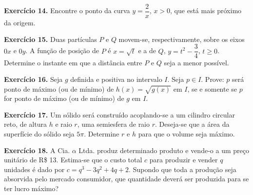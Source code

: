 \documentclass[12pt,a4paper]{article}
\begin{document}
\vspace{0.5cm}
\noindent\textbf{Exercício 14.} Encontre o ponto da curva $y = \dfrac{2}{x}$, $x > 0$, que está mais próximo da origem.

\vspace{0.5cm}
\noindent\textbf{Exercício 15.} Duas partículas $P$ e $Q$ movem-se, respectivamente, sobre os eixos $0x$ e $0y$. A função de posição de $P$ é $x = \sqrt{t}$ e a de $Q$, $y = t^2 - \dfrac{3}{4}$, $t \ge 0$. Determine o instante em que a distância entre $P$ e $Q$ seja a menor possível.

\vspace{0.5cm}
\noindent\textbf{Exercício 16.} Seja $g$ definida e positiva no intervalo $I$. Seja $p \in I$. Prove: $p$ será ponto de máximo (ou de mínimo) de $h(x) = \sqrt{g(x)}$ em $I$, se e somente se $p$ for ponto de máximo (ou de mínimo) de $g$ em $I$.

\vspace{0.5cm}
\noindent\textbf{Exercício 17.} Um sólido será construído acoplando-se a um cilindro circular reto, de altura $h$ e raio $r$, uma semiesfera de raio $r$. Deseja-se que a área da superfície do sólido seja $5\pi$. Determine $r$ e $h$ para que o volume seja máximo.

\begin{center}
\end{center}

\vspace{0.5cm}
\noindent\textbf{Exercício 18.} A Cia. $\alpha$ Ltda. produz determinado produto e vende-o a um preço unitário de R\$ 13. Estima-se que o custo total $c$ para produzir e vender $q$ unidades é dado por $c = q^3 - 3q^2 + 4q + 2$. Supondo que toda a produção seja absorvida pelo mercado consumidor, que quantidade deverá ser produzida para se ter lucro máximo?
\end{document}
